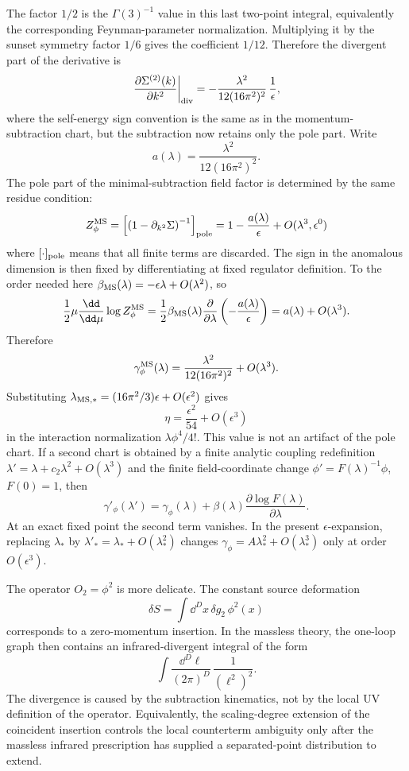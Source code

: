 The factor \(1/2\) is the \(\Gamma(3)^{-1}\) value in this last two-point
integral, equivalently the corresponding Feynman-parameter normalization.
Multiplying it by the sunset symmetry factor \(1/6\) gives the coefficient
\(1/12\).  Therefore the divergent part of the derivative is
\[
  \left.
  \frac{\partial\Sigma^{(2)}(k)}{\partial k^2}
  \right|_{\rm div}
  =
  -\frac{\lambda^2}{12(16\pi^2)^2}\,\frac1\epsilon ,
\]
where the self-energy sign convention is the same as in the
momentum-subtraction chart, but the subtraction now retains only the pole
part.  Write
\[
  a(\lambda)=\frac{\lambda^2}{12(16\pi^2)^2}.
\]
The pole part of the minimal-subtraction field factor is determined by the same
residue condition:
\[
  Z_\phi^{\rm MS}
  =
  \left[
    \left(1-\partial_{k^2}\Sigma\right)^{-1}
  \right]_{\rm pole}
  =
  1-\frac{a(\lambda)}{\epsilon}
  +O(\lambda^3,\epsilon^0)
\]
where \([\cdot]_{\rm pole}\) means that all finite terms are discarded.  The
sign in the anomalous dimension is then fixed by differentiating at fixed
regulator definition.  To the order needed here
\(\beta_{\rm MS}(\lambda)=-\epsilon\lambda+O(\lambda^2)\), so
\[
  \frac12\mu\frac{\dd}{\dd\mu}\log Z_\phi^{\rm MS}
  =
  \frac12\beta_{\rm MS}(\lambda)\frac{\partial}{\partial\lambda}
  \left(-\frac{a(\lambda)}{\epsilon}\right)
  =
  a(\lambda)+O(\lambda^3).
\]
Therefore
\[
  \gamma_\phi^{\rm MS}(\lambda)
  =
  \frac{\lambda^2}{12(16\pi^2)^2}+O(\lambda^3).
\]
Substituting \(\lambda_{{\rm MS},*}=(16\pi^2/3)\epsilon+O(\epsilon^2)\) gives
\[
  \eta=\frac{\epsilon^2}{54}+O(\epsilon^3)
\]
in the interaction normalization \(\lambda\phi^4/4!\).
This value is not an artifact of the pole chart.  If a second chart is obtained
by a finite analytic coupling redefinition
\(\lambda'=\lambda+c_2\lambda^2+O(\lambda^3)\) and the finite field-coordinate
change \(\phi'=F(\lambda)^{-1}\phi\), \(F(0)=1\), then
\[
  \gamma'_\phi(\lambda')
  =
  \gamma_\phi(\lambda)
  +
  \beta(\lambda)\frac{\partial\log F(\lambda)}{\partial\lambda}.
\]
At an exact fixed point the second term vanishes.  In the present
\(\epsilon\)-expansion, replacing \(\lambda_*\) by
\(\lambda'_*= \lambda_*+O(\lambda_*^2)\) changes
\(\gamma_\phi=A\lambda_*^2+O(\lambda_*^3)\) only at order \(O(\epsilon^3)\).

The operator \(O_2=\phi^2\) is more delicate.  The constant source deformation
\[
  \delta S=\int\dd^D x\,\delta g_2\,\phi^2(x)
\]
corresponds to a zero-momentum insertion.  In the massless theory, the
one-loop graph then contains an infrared-divergent integral of the form
\[
  \int\frac{\dd^D\ell}{(2\pi)^D}\,\frac{1}{(\ell^2)^2}.
\]
The divergence is caused by the subtraction kinematics, not by the local UV
definition of the operator.  Equivalently, the scaling-degree extension of the
coincident insertion controls the local counterterm ambiguity only after the
massless infrared prescription has supplied a separated-point distribution to
extend.

